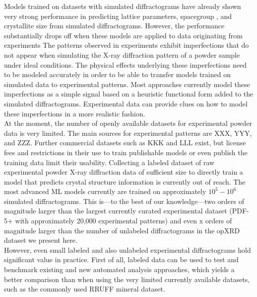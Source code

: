 Models trained on datasets with simulated diffractograms have already shown very strong performance in predicting lattice parameters\cite{Dong2021, Chitturi2021, Habershon2004, zhang2024crystallographic}, spacegroup \cite{Schopmans2023, Oviedo2018, Park2017, Vecsei2018, Zaloga2020, Suzuki2020, Chakraborty2021,zhang2024crystallographic}, and crystallite size \cite{Dong2021, Chakraborty2021} from simulated diffractograms.
However, the performance substantially drops off when these models are applied to data originating from experiments \cite{Schopmans2023,zhang2024crystallographic, Wang2020, Vecsei2018} The patterns observed in experiments exhibit imperfections that do not appear when simulating the X-ray diffraction pattern of a powder sample under ideal conditions. The physical effects underlying these imperfections need to be modeled accurately in order to be able to transfer models trained on simulated data to experimental patterns. Most approaches currently model these imperfections as a simple signal based on a heuristic functional form added to the simulated diffractograms. Experimental data can provide clues on how to model these imperfections in a more realistic fashion. \\

At the moment, the number of openly available datasets for experimental powder data is very limited. The main sources for experimental patterns are XXX, YYY, and ZZZ. Further commercial datasets such as KKK and LLL exist, but license fees and restrictions in their use to train publishable models or even publish the training data limit their usability. Collecting a labeled dataset of raw experimental powder X-ray diffraction data of sufficient size to directly train a model that predicts crystal structure information is currently out of reach. The most advanced ML models currently are trained on approximately $10^5 - 10^6$ simulated diffractograms. \cite{Salgado2023, Schopmans2023}
This is---to the best of our knowledge---two orders of magnitude larger than the largest currently curated experimental dataset (PDF-5+ with approximately 20,000 experimental patterns) and even x orders of magnitude larger than the number of unlabeled diffractograms in the opXRD dataset we present here. \\

However, even small labeled and also unlabeled experimental diffractograms hold significant value in practice. First of all, labeled data can be used to test and benchmark existing and new automated analysis approaches, which yields a better comparison than when using the very limited currently available datasets, such as the commonly used RRUFF mineral dataset\cite{Armbruster2015}. \\

